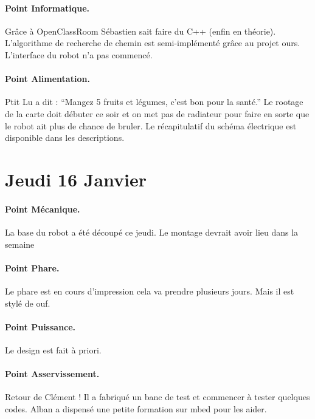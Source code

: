 \documentclass[a4paper,10pt]{report}
\theoremstyle{definition}
\begin{document}
\begin{spacing}{1.5}
\paragraph{Point Informatique.}
Grâce à OpenClassRoom Sébastien sait faire du C++ (enfin en théorie).
L'algorithme de recherche de chemin est semi-implémenté grâce au projet ours.
L'interface du robot n'a pas commencé.
\paragraph{Point Alimentation.}
Ptit Lu a dit : ``Mangez 5 fruits et légumes, c'est bon pour la santé.''
Le rootage de la carte doit débuter ce soir et on met pas de radiateur pour
faire en sorte que le robot ait plus de chance de bruler. Le récapitulatif du
schéma électrique est disponible dans les descriptions.


\newpage
\section*{Jeudi 16 Janvier}
\paragraph{Point Mécanique.}
La base du robot a été découpé ce jeudi. Le montage devrait avoir lieu dans la semaine
\paragraph{Point Phare.}
Le phare est en cours d'impression cela va prendre plusieurs jours. Mais il est
stylé de ouf.
\paragraph{Point Puissance.}
Le design est fait à priori.
\paragraph{Point Asservissement.}
Retour de Clément ! Il a fabriqué un banc de test et commencer à tester quelques
codes. Alban a dispensé une petite formation sur mbed pour les aider.

\end{spacing}
\end{document}
